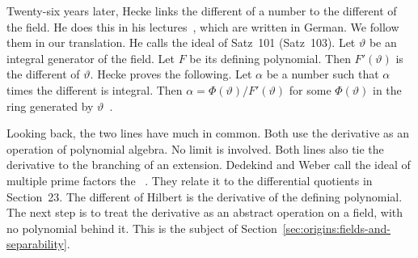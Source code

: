 Twenty-six years later, Hecke links the different of a number to the different of the field. He does
this in his lectures~\cite{Hecke1923}, which are written in German. We follow
them in our translation. He calls the ideal of Satz~101
 (Satz~103). Let
$\vartheta$ be an integral generator of the field. Let $F$ be its defining
polynomial. Then $F'(\vartheta)$ is the different of $\vartheta$. Hecke
proves the following. Let $\alpha$ be a number such that $\alpha$ times the
different is integral. Then $\alpha = \Phi(\vartheta)/F'(\vartheta)$ for
some $\Phi(\vartheta)$ in the ring generated by
$\vartheta$~\cite[\S 36, pp.~133--134]{Hecke1923}.

Looking back, the two lines have much in common. Both use the derivative as an operation of polynomial algebra. No limit
is involved. Both lines also tie the derivative to the branching of an
extension. Dedekind and Weber call the ideal of multiple prime factors the
%
~\cite[\S 11, p.~226]{DedekindWeber1882}. They relate it to the differential
quotients in Section~23. The different of Hilbert is the derivative of the
defining polynomial. The next step is to treat the derivative as an abstract
operation on a field, with no polynomial behind it. This is the subject of
Section~\ref{sec:origins:fields-and-separability}.
